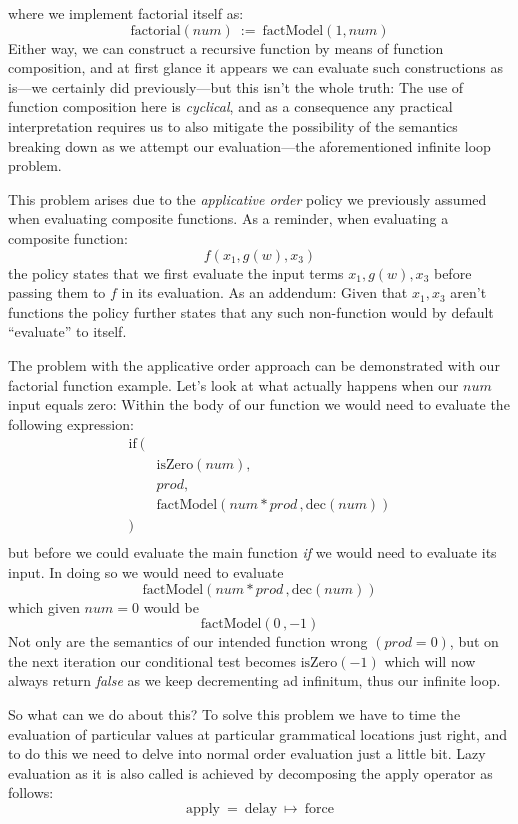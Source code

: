 \documentclass[twoside]{article}
\begin{document}
where we implement factorial itself as:
$$ \mbox{factorial}(num)\ :=\ \mbox{factModel}(1, num) $$
Either way, we can construct a recursive function by means of function composition, and at first glance it appears
we can evaluate such constructions as is---we certainly did previously---but this isn't the whole truth: The use
of function composition here is \emph{cyclical}, and as a consequence any practical interpretation requires us
to also mitigate the possibility of the semantics breaking down as we attempt our evaluation---the
aforementioned infinite loop problem.

This problem arises due to the \emph{applicative order} policy we previously assumed when evaluating composite
functions. As a reminder, when evaluating a composite function:
$$ f(x_1,g(w),x_3) $$
the policy states that we first evaluate the input terms $ x_1, g(w), x_3 $ before passing them to $ f $ in its
evaluation. As an addendum: Given that $ x_1, x_3 $ aren't functions the policy further states that any such
non-function would by default ``evaluate'' to itself.

The problem with the applicative order approach can be demonstrated with our factorial function example. Let's look
at what actually happens when our $ num $ input equals zero: Within the body of our function we would need to evaluate
the following expression:
$$ \begin{array}{rl}
\mbox{if}\ (								\\
		& \mbox{isZero}(num),					\\
		& prod,							\\
		& \mbox{factModel}(num*prod\,, \mbox{dec}(num))		\\
)									\\
\end{array} $$
but before we could evaluate the main function \emph{if} we would need to evaluate its input. In doing so
we would need to evaluate
$$ \mbox{factModel}(num*prod\,, \mbox{dec}(num)) $$
which given $ num = 0 $ would be
$$ \mbox{factModel}(0\,, -1) $$
Not only are the semantics of our intended function wrong $(prod = 0)$, but on the next iteration our conditional
test becomes $ \mbox{isZero}(-1) $ which will now always return \emph{false} as we keep decrementing ad infinitum,
thus our infinite loop.

So what can we do about this? To solve this problem we have to time the evaluation of particular values at particular
grammatical locations just right, and to do this we need to delve into normal order evaluation just a little bit.
Lazy evaluation as it is also called is achieved by decomposing the apply operator as follows:
$$ \mbox{apply}\ =\ \mbox{delay}\ \mapsto\ \mbox{force} $$
\end{document}
